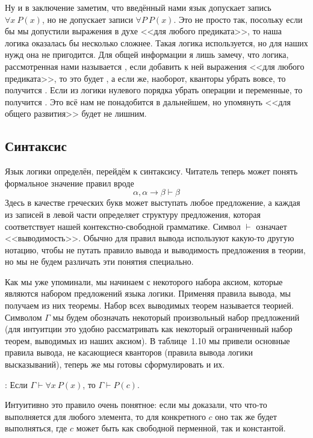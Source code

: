 Ну и в заключение заметим, что введённый нами язык допускает запись $\forall x\ P(x)$, но не допускает записи $\forall P\ P(x)$. Это не просто так, посольку если бы мы допустили выражения в духе <<для любого предиката>>, то наша логика оказалась бы несколько сложнее. Такая логика используется, но для наших нужд она не пригодится. Для общей информации я лишь замечу, что логика, рассмотренная нами называется , если добавить к ней выражения <<для любого предиката>>, то это будет , а если же, наоборот, кванторы убрать вовсе, то получится . Если из логики нулевого порядка убрать операции и переменные, то получится . Это всё нам не понадобится в дальнейшем, но упомянуть <<для общего развития>> будет не лишним.

\subsection{Синтаксис}

Язык логики определён, перейдём к синтаксису. Читатель теперь может понять формальное значение правил вроде
$$\alpha, \alpha\to\beta \vdash \beta$$
Здесь в качестве греческих букв может выступать любое предложение, а каждая из записей в левой части определяет структуру предложения, которая соответствует нашей контекстно-свободной грамматике. Символ $\vdash$ означает <<выводимость>>. Обычно для правил вывода  используют какую-то другую нотацию, чтобы не путать правило вывода и выводимость предложения в теории, но мы не будем различать эти понятия специально.

Как мы уже упоминали, мы начинаем с некоторого набора аксиом, которые являются набором предложений языка логики. Применяя правила вывода, мы получаем из них теоремы. Набор всех выводимых теорем называется теорией. Символом $\Gamma$ мы будем обозначать некоторый произвольный набор предложений (для интуитции это удобно рассматривать как некоторый ограниченный набор теорем, выводимых из наших аксиом). В таблице~1.10 мы привели основные правила вывода, не касающиеся кванторов (правила вывода логики высказываний), теперь же мы готовы сформулировать и их.

: Если $\Gamma \vdash \forall x\ P(x)$, то $\Gamma \vdash P(c)$.

Интуитивно это правило очень понятное: если мы доказали, что что-то выполняется для любого элемента, то для конкретного $c$ оно так же будет выполняться, где $c$ может быть как свободной перменной, так и константой.

